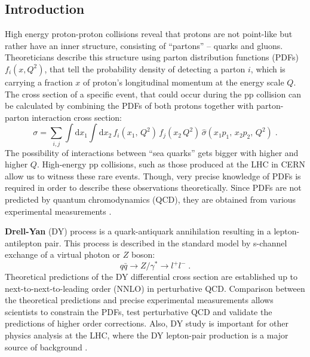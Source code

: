 \documentclass[a0,portrait]{a0poster}
\begin{document}
\begin{multicols}{2}

\small

\section*{Introduction}
\begin{centering}
	\begin{minipage}{0.63\linewidth}
		High energy proton-proton collisions reveal that protons are not point-like but rather have an inner structure, consisting
		of ``partons'' -- quarks and gluons.
		Theoreticians describe this structure using parton distribution functions (PDFs) $f_i(x, Q^2)$, that tell the
		probability density of detecting a parton $i$, which is carrying a fraction $x$ of proton's longitudinal momentum
		at the energy scale $Q$.
		The cross section of a specific event, that could occur during the pp collision can be calculated by combining
		the PDFs of both protons together with parton-parton interaction cross section:
		\begin{equation}
			\label{eq:SigmaFromPDFs}
			\sigma = \sum_{i, j} \int \mathrm{d}x_1 \int \mathrm{d}x_2 \,
			f_{i}(x_1, \, Q^2) \, f_{j}(x_2 \, Q^2) \, \hat{\sigma}(x_1 p_1, \, x_2 p_2, \, Q^2) \; \mathrm{.}
		\end{equation}
		The possibility of interactions between ``sea quarks'' gets bigger with higher and higher $Q$.
		High-energy pp collisions, such as those produced at the LHC in CERN allow us to witness these rare events.
		Though, very precise knowledge of PDFs is required in order to describe these observations theoretically.
		Since PDFs are not predicted by quantum chromodynamics (QCD), they are obtained from various experimental
		measurements \cite{PDFs}.
		
		\vspace{1cm}
				
		\textbf{Drell-Yan} (DY) process is a quark-antiquark annihilation resulting in a lepton-antilepton pair.
		This process is described in the standard model by s-channel exchange of a virtual photon or $Z$ boson:
		\begin{equation*}
			q\bar{q}\rightarrow Z/\gamma^{*}\rightarrow l^{+}l^{-} \; .
		\end{equation*}
		Theoretical predictions of the DY differential cross section are established up to next-to-next-to-leading
		order (NNLO) in perturbative QCD.
		Comparison between the theoretical predictions and precise experimental measurements allows scientists to
		constrain the PDFs, test perturbative QCD and validate the predictions of higher order corrections.
		Also, DY study is important for other physics analysis at the LHC, where the DY lepton-pair production is
		a major source of background \cite{DYRidhi}.
		

\end{minipage}
\end{centering}
\end{multicols}
\end{document}
